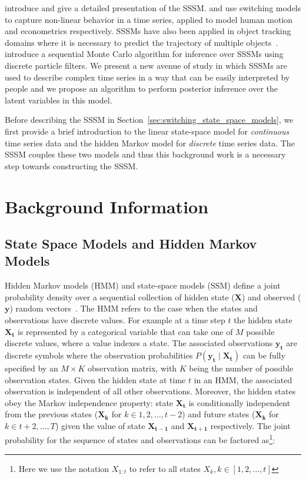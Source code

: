 \citet{ghahramani2000variational} introduce and give a detailed presentation of the SSSM. \citet{pavlovic2001learning} and \citet{giordani2007unified} use switching models to capture non-linear behavior in a time series, applied to model human motion and econometrics respectively. SSSMs have also been applied in object tracking domains where it is necessary to predict the trajectory of multiple objects~\citep{fox2007hierarchical}. \citet{whiteley2010efficient} introduce a sequential Monte Carlo algorithm for inference over SSSMs using discrete particle filters. We present a new avenue of study in which SSSMs are used to describe complex time series in a way that can be easily interpreted by people and we propose an algorithm to perform posterior inference over the latent variables in this model.

Before describing the SSSM in Section~\ref{sec:switching_state_space_models}, we first provide a brief introduction to the linear state-space model for \textit{continuous} time series data and the hidden Markov model for \textit{discrete} time series data. The SSSM couples these two models and thus this background work is a necessary step towards constructing the SSSM.


\section{Background Information}
\subsection{State Space Models and Hidden Markov Models}\label{sec:state_space_and_hidden_markov_models}
Hidden Markov models (HMM) and state-space models (SSM) define a joint probability density over a sequential collection of hidden state ($\mathbf{X}$) and observed ($\mathbf{y}$) random vectors~\citep{ghahramani2001introduction,shumway2000time}. The HMM refers to the case when the states and observations have discrete values. For example at a time step $t$ the hidden state $\mathbf{X_t}$ is represented by a categorical variable that can take one of $M$ possible discrete values, where a value indexes a state. The associated observations $\mathbf{y_t}$ are discrete symbols where the observation probabilities $P(\mathbf{y_t} \mid \mathbf{X_t})$ can be fully specified by an $M \times K$ observation matrix, with $K$ being the number of possible observation states. Given the hidden state at time $t$ in an HMM, the associated observation is independent of all other observations. Moreover, the hidden states obey the Markov independence property: state $\mathbf{X_{t}}$ is conditionally independent from the previous states ($\mathbf{X_{k}}$ for $k \in 1,2, \hdots, t-2$) and future states ($\mathbf{X_{k}}$ for $k \in t+2, \hdots, T$) given the value of state $\mathbf{X_{t-1}}$ and $\mathbf{X_{t+1}}$ respectively. The joint probability for the sequence of states and observations can be factored as\footnote{Here we use the notation $X_{1:t}$ to refer to all states $X_k, k \in [1,2,\hdots,t]$}:

